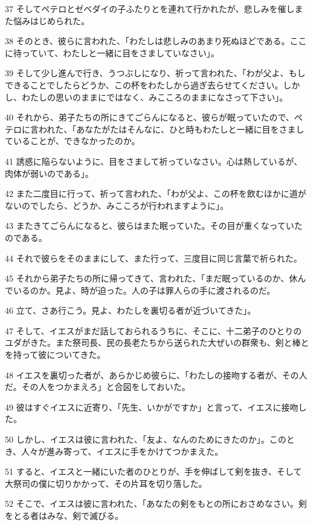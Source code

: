 \par 37 そしてペテロとゼベダイの子ふたりとを連れて行かれたが、悲しみを催しまた悩みはじめられた。
\par 38 そのとき、彼らに言われた、「わたしは悲しみのあまり死ぬほどである。ここに待っていて、わたしと一緒に目をさましていなさい」。
\par 39 そして少し進んで行き、うつぶしになり、祈って言われた、「わが父よ、もしできることでしたらどうか、この杯をわたしから過ぎ去らせてください。しかし、わたしの思いのままにではなく、みこころのままになさって下さい」。
\par 40 それから、弟子たちの所にきてごらんになると、彼らが眠っていたので、ペテロに言われた、「あなたがたはそんなに、ひと時もわたしと一緒に目をさましていることが、できなかったのか。
\par 41 誘惑に陥らないように、目をさまして祈っていなさい。心は熱しているが、肉体が弱いのである」。
\par 42 また二度目に行って、祈って言われた、「わが父よ、この杯を飲むほかに道がないのでしたら、どうか、みこころが行われますように」。
\par 43 またきてごらんになると、彼らはまた眠っていた。その目が重くなっていたのである。
\par 44 それで彼らをそのままにして、また行って、三度目に同じ言葉で祈られた。
\par 45 それから弟子たちの所に帰ってきて、言われた、「まだ眠っているのか、休んでいるのか。見よ、時が迫った。人の子は罪人らの手に渡されるのだ。
\par 46 立て、さあ行こう。見よ、わたしを裏切る者が近づいてきた」。
\par 47 そして、イエスがまだ話しておられるうちに、そこに、十二弟子のひとりのユダがきた。また祭司長、民の長老たちから送られた大ぜいの群衆も、剣と棒とを持って彼についてきた。
\par 48 イエスを裏切った者が、あらかじめ彼らに、「わたしの接吻する者が、その人だ。その人をつかまえろ」と合図をしておいた。
\par 49 彼はすぐイエスに近寄り、「先生、いかがですか」と言って、イエスに接吻した。
\par 50 しかし、イエスは彼に言われた、「友よ、なんのためにきたのか」。このとき、人々が進み寄って、イエスに手をかけてつかまえた。
\par 51 すると、イエスと一緒にいた者のひとりが、手を伸ばして剣を抜き、そして大祭司の僕に切りかかって、その片耳を切り落した。
\par 52 そこで、イエスは彼に言われた、「あなたの剣をもとの所におさめなさい。剣をとる者はみな、剣で滅びる。
